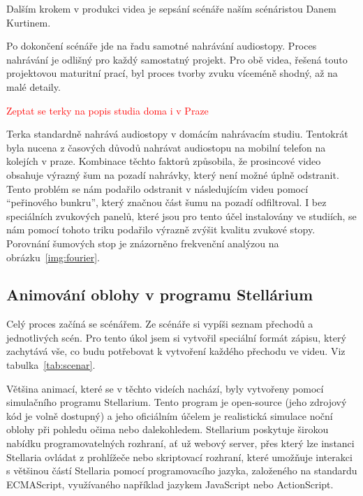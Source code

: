 \documentclass[12pt,a4paper,titlepage]{article}
\begin{document}
Dalším krokem v produkci videa je sepsání scénáře naším scénáristou Danem Kurtinem. 

Po dokončení scénáře jde na řadu samotné nahrávání audiostopy. Proces nahrávání je odlišný pro každý samostatný projekt. Pro obě videa, řešená touto projektovou maturitní prací, byl proces tvorby zvuku víceméně shodný, až na malé detaily. 

\textcolor{red}{Zeptat se terky na popis studia doma i v Praze}

Terka standardně nahrává audiostopy v domácím nahrávacím studiu. Tentokrát byla nucena z časových důvodů nahrávat audiostopu na mobilní telefon na kolejích v praze. Kombinace těchto faktorů způsobila, že prosincové video obsahuje výrazný šum na pozadí nahrávky, který není možné úplně odstranit. Tento problém se nám podařilo odstranit v následujícím videu pomocí \enquote{peřinového bunkru}, který značnou část šumu na pozadí odfiltroval. I bez speciálních zvukových panelů, které jsou pro tento účel instalovány ve studiích, se nám pomocí tohoto triku podařilo výrazně zvýšit kvalitu zvukové stopy. Porovnání šumových stop je znázorněno frekvenční analýzou na obrázku~\ref{img:fourier}.
\subsection{Animování oblohy v programu Stellárium}\label{makingof:stellarium}
Celý proces začíná se scénářem. Ze scénáře si vypíši seznam přechodů a jednotlivých scén. Pro tento úkol jsem si vytvořil speciální formát zápisu, který zachytává vše, co budu potřebovat k vytvoření každého přechodu ve videu. Viz tabulka~\ref{tab:scenar}.

Většina animací, které se v těchto videích nachází, byly vytvořeny pomocí simulačního programu Stellarium. Tento program je open-source (jeho zdrojový kód je volně dostupný) a jeho oficiálním účelem je realistická simulace noční oblohy při pohledu očima nebo dalekohledem. Stellarium poskytuje širokou nabídku programovatelných rozhraní, ať už webový server, přes který lze instanci Stellaria ovládat z prohlížeče nebo skriptovací rozhraní, které umožňuje interakci s většinou částí Stellaria pomocí programovacího jazyka, založeného na standardu ECMAScript, využívaného například jazykem JavaScript nebo ActionScript.
\end{document}
